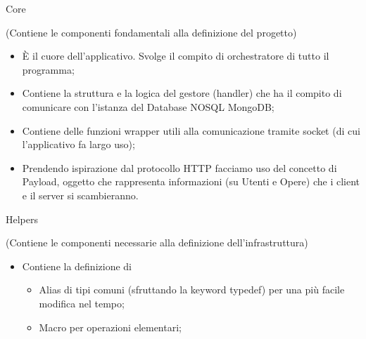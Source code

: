     \begin{minipage}{0.45\textwidth}
      \begin{center}
        {\Huge Core}

        (Contiene le componenti fondamentali alla definizione del progetto)
      \end{center}
      \vspace{0.5cm}

      \begin{itemize}
        \setlength\itemsep{1em}
        \item {} \rightarrow È il cuore dell’applicativo. Svolge il compito di orchestratore di tutto il programma;
        \item {} \rightarrow Contiene la struttura e la logica del gestore (handler) che ha il compito di comunicare con l’istanza del Database NOSQL MongoDB;
        \item {} \rightarrow Contiene delle funzioni wrapper utili alla comunicazione tramite socket (di cui l’applicativo fa largo uso);
        \item {} \rightarrow Prendendo ispirazione dal protocollo HTTP facciamo uso del concetto di Payload, oggetto che rappresenta informazioni (su Utenti e Opere) che i client e il server si scambieranno.
      \end{itemize}

      \vspace{1cm}

      \begin{center}
        {\Huge Helpers}

        (Contiene le componenti necessarie alla definizione dell’infrastruttura)
      \end{center}
      \vspace{0.5cm}

      \begin{itemize}
        \setlength\itemsep{1em}
        \item {} \rightarrow Contiene la definizione di \begin{itemize} \item Alias di tipi comuni (sfruttando la keyword typedef) per una più facile modifica nel tempo; \item Macro per operazioni elementari; \end{itemize}


\end{itemize}
\end{minipage}
